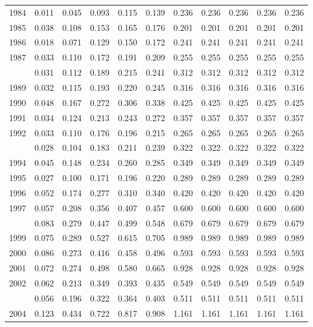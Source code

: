 \documentclass[
]{article}
\begin{document}
\begin{longtable}[t]{lrrrrrrrrrr}
1984 & 0.011 & 0.045 & 0.093 & 0.115 & 0.139 & 0.236 & 0.236 & 0.236 & 0.236 & 0.236\\
1985 & 0.038 & 0.108 & 0.153 & 0.165 & 0.176 & 0.201 & 0.201 & 0.201 & 0.201 & 0.201\\
1986 & 0.018 & 0.071 & 0.129 & 0.150 & 0.172 & 0.241 & 0.241 & 0.241 & 0.241 & 0.241\\
1987 & 0.033 & 0.110 & 0.172 & 0.191 & 0.209 & 0.255 & 0.255 & 0.255 & 0.255 & 0.255\\
\addlinespace
1988 & 0.031 & 0.112 & 0.189 & 0.215 & 0.241 & 0.312 & 0.312 & 0.312 & 0.312 & 0.312\\
1989 & 0.032 & 0.115 & 0.193 & 0.220 & 0.245 & 0.316 & 0.316 & 0.316 & 0.316 & 0.316\\
1990 & 0.048 & 0.167 & 0.272 & 0.306 & 0.338 & 0.425 & 0.425 & 0.425 & 0.425 & 0.425\\
1991 & 0.034 & 0.124 & 0.213 & 0.243 & 0.272 & 0.357 & 0.357 & 0.357 & 0.357 & 0.357\\
1992 & 0.033 & 0.110 & 0.176 & 0.196 & 0.215 & 0.265 & 0.265 & 0.265 & 0.265 & 0.265\\
\addlinespace
1993 & 0.028 & 0.104 & 0.183 & 0.211 & 0.239 & 0.322 & 0.322 & 0.322 & 0.322 & 0.322\\
1994 & 0.045 & 0.148 & 0.234 & 0.260 & 0.285 & 0.349 & 0.349 & 0.349 & 0.349 & 0.349\\
1995 & 0.027 & 0.100 & 0.171 & 0.196 & 0.220 & 0.289 & 0.289 & 0.289 & 0.289 & 0.289\\
1996 & 0.052 & 0.174 & 0.277 & 0.310 & 0.340 & 0.420 & 0.420 & 0.420 & 0.420 & 0.420\\
1997 & 0.057 & 0.208 & 0.356 & 0.407 & 0.457 & 0.600 & 0.600 & 0.600 & 0.600 & 0.600\\
\addlinespace
1998 & 0.083 & 0.279 & 0.447 & 0.499 & 0.548 & 0.679 & 0.679 & 0.679 & 0.679 & 0.679\\
1999 & 0.075 & 0.289 & 0.527 & 0.615 & 0.705 & 0.989 & 0.989 & 0.989 & 0.989 & 0.989\\
2000 & 0.086 & 0.273 & 0.416 & 0.458 & 0.496 & 0.593 & 0.593 & 0.593 & 0.593 & 0.593\\
2001 & 0.072 & 0.274 & 0.498 & 0.580 & 0.665 & 0.928 & 0.928 & 0.928 & 0.928 & 0.928\\
2002 & 0.062 & 0.213 & 0.349 & 0.393 & 0.435 & 0.549 & 0.549 & 0.549 & 0.549 & 0.549\\
\addlinespace
2003 & 0.056 & 0.196 & 0.322 & 0.364 & 0.403 & 0.511 & 0.511 & 0.511 & 0.511 & 0.511\\
2004 & 0.123 & 0.434 & 0.722 & 0.817 & 0.908 & 1.161 & 1.161 & 1.161 & 1.161 & 1.161\\

\end{longtable}
\end{document}

